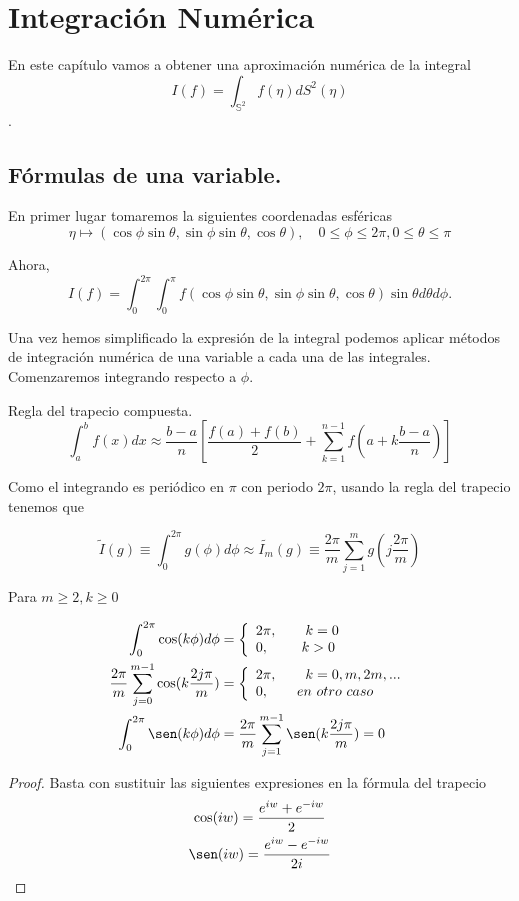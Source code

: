 \chapter[Integración Numérica]{Integración Numérica}
En este capítulo vamos a obtener una aproximación numérica de la integral $$ I(f) = \int_{\mathds{S}^2} f(\eta) dS^2(\eta) $$. 
\section{Fórmulas de una variable.}
En primer lugar tomaremos la siguientes coordenadas esféricas
$$ \eta \mapsto (\cos\phi \sin\theta, \sin\phi \sin\theta,\cos \theta), \quad 0\le \phi \le 2\pi, 0\le \theta \le \pi$$
 
Ahora, 
$$
I(f) = \int_{0}^{2\pi} \int_{0}^{\pi} f(\cos\phi \sin\theta, \sin\phi \sin\theta,\cos \theta)\sin\theta d\theta d\phi. 
$$

Una vez hemos simplificado la expresión de la integral podemos aplicar métodos de integración numérica de una variable a cada una de las integrales. Comenzaremos integrando respecto a $\phi$.
\medskip
\begin{rem}Regla del trapecio compuesta.
	$$\int_{a}^{b} f(x)dx \approx \frac{b-a}{n}\left[\frac{f(a)+f(b)}{2}+\sum_{k=1}^{n-1}f(a+k\frac{b-a}{n})\right]
	$$
\end{rem}

Como el integrando es periódico en $\pi$ con periodo $2\pi$, usando la regla del trapecio tenemos que

$$
\widetilde{I}(g)\equiv \int_{0}^{2\pi} g(\phi)d\phi \approx \widetilde{I_m}(g) \equiv \frac{2\pi}{m} \sum_{j=1}^{m} g(j\frac{2\pi}{m})
$$

\begin{lem} Para $m\ge 2,k\ge 0$
	
	\begin{gather*}
	\begin{aligned}
	\int_{0}^{2\pi} \cos(k\phi)d\phi &= \left\{\begin{array}{ll} 2\pi, \qquad k=0 
											\\ 0 ,  \qquad\  k>0
		\end{array} 
		\right.
	\\
	\frac{2\pi}{m}\sum_{j=0}^{m-1}\cos(k\frac{2j\pi}{m}) &= \left\{\begin{array}{ll} 2\pi, \qquad k=0,m,2m,... 
	\\ 0 ,  \qquad en\ otro\ caso
	\end{array} 
	\right.
	\\
	\int_{0}^{2\pi} \sen(k\phi)d\phi &=  \frac{2\pi}{m}\sum_{j=1}^{m-1}\sen(k\frac{2j\pi}{m}) =0 
	\end{aligned}
	\end{gather*}
\end{lem}
\begin{proof}
Basta con sustituir las siguientes expresiones en la fórmula del trapecio
\begin{gather*}
\cos(iw) = \frac{e^{iw}+e^{-iw}}{2} \\
\sen(iw) = \frac{e^{iw}-e^{-iw}}{2i}
\end{gather*} 
\end{proof}

